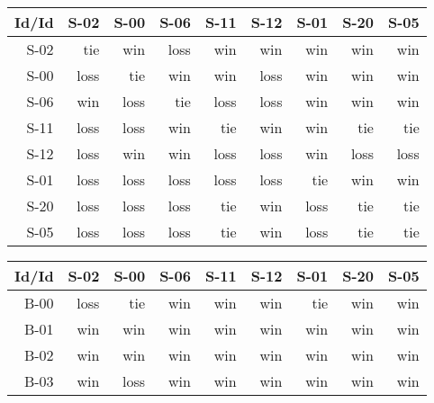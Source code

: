\begin{tabular}{ | r | r | r | r | r | r | r | r | r | }
    \hline
        Id/Id  &   S-02  &   S-00  &   S-06  &   S-11  &   S-12  &   S-01  &   S-20  &   S-05  \\
    \hline
    \hline
         S-02  &    tie  &    win  &   loss  &    win  &    win  &    win  &    win  &    win  \\
    \hline
         S-00  &   loss  &    tie  &    win  &    win  &   loss  &    win  &    win  &    win  \\
    \hline
         S-06  &    win  &   loss  &    tie  &   loss  &   loss  &    win  &    win  &    win  \\
    \hline
         S-11  &   loss  &   loss  &    win  &    tie  &    win  &    win  &    tie  &    tie  \\
    \hline
         S-12  &   loss  &    win  &    win  &   loss  &   loss  &    win  &   loss  &   loss  \\
    \hline
         S-01  &   loss  &   loss  &   loss  &   loss  &   loss  &    tie  &    win  &    win  \\
    \hline
         S-20  &   loss  &   loss  &   loss  &    tie  &    win  &   loss  &    tie  &    tie  \\
    \hline
         S-05  &   loss  &   loss  &   loss  &    tie  &    win  &   loss  &    tie  &    tie  \\
    \hline
\end{tabular}


\begin{tabular}{ | r | r | r | r | r | r | r | r | r | }
    \hline
        Id/Id  &   S-02  &   S-00  &   S-06  &   S-11  &   S-12  &   S-01  &   S-20  &   S-05  \\
    \hline
    \hline
         B-00  &   loss  &    tie  &    win  &    win  &    win  &    tie  &    win  &    win  \\
    \hline
         B-01  &    win  &    win  &    win  &    win  &    win  &    win  &    win  &    win  \\
    \hline
         B-02  &    win  &    win  &    win  &    win  &    win  &    win  &    win  &    win  \\
    \hline
         B-03  &    win  &   loss  &    win  &    win  &    win  &    win  &    win  &    win  \\
    \hline
\end{tabular}




